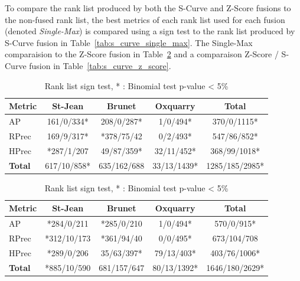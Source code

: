 To compare the rank list produced by both the S-Curve and Z-Score fusions to the non-fused rank list, the best metrics of each rank list used for each fusion (denoted \textit{Single-Max}) is compared using a sign test to the rank list produced by S-Curve fusion in Table~\ref{tab:s_curve_single_max}.
The Single-Max comparaision to the Z-Score fusion in Table~\ref{tab:z_score_single_max} and a comparaison Z-Score / S-Curve fusion in Table~\ref{tab:s_curve_z_score}.

\begin{table}
  \centering
  \caption{Rank list sign test, * : Binomial test p-value < 5\%}
  \label{tab:fusion_sign_test_comparaisons}

  \label{tab:s_curve_single_max}
  \begin{tabular}{l c c c c}
    \toprule
    Metric         & St-Jean     & Brunet      & Oxquarry    & \textbf{Total} \\ \midrule
    AP             & 161/0/334*  & 208/0/287*  & 1/0/494*    & 370/0/1115*    \\
    RPrec          & 169/9/317*  & *378/75/42  & 0/2/493*    & 547/86/852*    \\
    HPrec          & *287/1/207  & 49/87/359*  & 32/11/452*  & 368/99/1018*   \\
    \textbf{Total} & 617/10/858* & 635/162/688 & 33/13/1439* & 1285/185/2985* \\
    \bottomrule
  \end{tabular}

  \label{tab:z_score_single_max}
  \begin{tabular}{l c c c c}
    \toprule
    Metric        & St-Jean     & Brunet      & Oxquarry    & \textbf{Total} \\ \midrule
    AP            & *284/0/211  & *285/0/210  & 1/0/494*    & 570/0/915*     \\
    RPrec         & *312/10/173 & *361/94/40  & 0/0/495*    & 673/104/708    \\
    HPrec         & *289/0/206  & 35/63/397*  & 79/13/403*  & 403/76/1006*   \\
    \textbf{Total}& *885/10/590 & 681/157/647 & 80/13/1392* & 1646/180/2629* \\
    \bottomrule
  \end{tabular}


\end{table}
